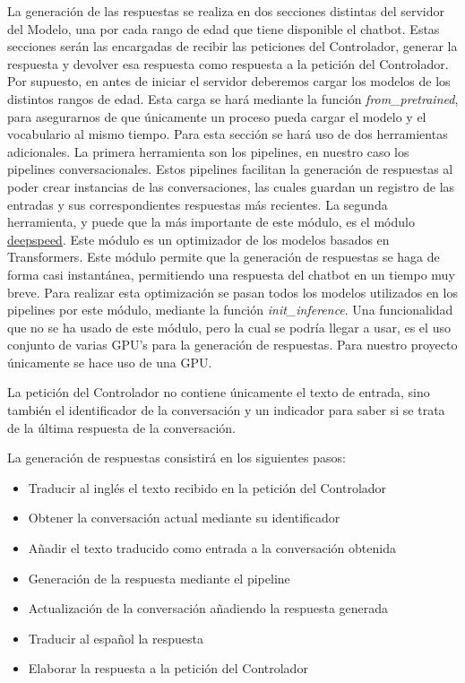 La generación de las respuestas se realiza en dos secciones distintas del servidor del Modelo, una por cada rango de edad que tiene disponible el chatbot. Estas secciones serán las encargadas de recibir las peticiones del Controlador, generar la respuesta y devolver esa respuesta como respuesta a la petición del Controlador. Por supuesto, en antes de iniciar el servidor deberemos cargar los modelos de los distintos rangos de edad. Esta carga se hará mediante la función \textit{from\_pretrained}, para asegurarnos de que únicamente un proceso pueda cargar el modelo y el vocabulario al mismo tiempo. Para esta sección se hará uso de dos herramientas adicionales. La primera herramienta son los pipelines, en nuestro caso los pipelines conversacionales. Estos pipelines facilitan la generación de respuestas al poder crear instancias de las conversaciones, las cuales guardan un registro de las entradas y sus correspondientes respuestas más recientes. La segunda herramienta, y puede que la más importante de este módulo, es el módulo \href{https://deepspeed.readthedocs.io/en/latest/}{deepspeed}. Este módulo es un optimizador de los modelos basados en Transformers. Este módulo permite que la generación de respuestas se haga de forma casi instantánea, permitiendo una respuesta del chatbot en un tiempo muy breve. Para realizar esta optimización se pasan todos los modelos utilizados en los pipelines por este módulo, mediante la función \textit{init\_inference}. Una funcionalidad que no se ha usado de este módulo, pero la cual se podría llegar a usar, es el uso conjunto de varias GPU's para la generación de respuestas. Para nuestro proyecto únicamente se hace uso de una GPU.

La petición del Controlador no contiene únicamente el texto de entrada, sino también el identificador de la conversación y un indicador para saber si se trata de la última respuesta de la conversación.

La generación de respuestas consistirá en los siguientes pasos:

\begin{itemize}
\item Traducir al inglés el texto recibido en la petición del Controlador
\item Obtener la conversación actual mediante su identificador
\item Añadir el texto traducido como entrada a la conversación obtenida
\item Generación de la respuesta mediante el pipeline
\item Actualización de la conversación añadiendo la respuesta generada
\item Traducir al español la respuesta
\item Elaborar la respuesta a la petición del Controlador
\end{itemize}

